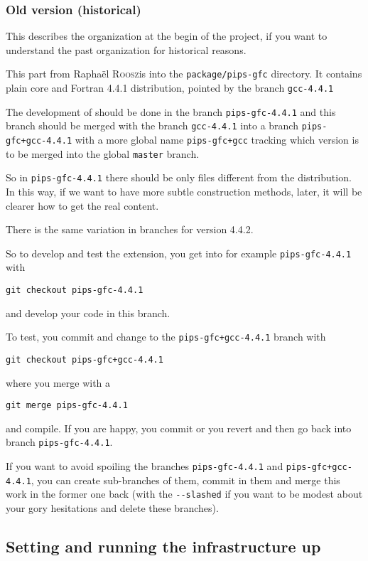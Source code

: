 \documentclass[a4paper]{article}
\begin{document}
\subsubsection{Old version (historical)}
\label{sec:old-version}


This describes the organization at the begin of the project, if you want
to understand the past organization for historical reasons.

This part from Raphaël \textsc{Roosz}is into the \texttt{package/pips-gfc}
directory. It contains plain \Agcc core and Fortran 4.4.1 distribution,
pointed by the branch \texttt{gcc-4.4.1}

The development of \Apipsgfc should be done in the branch
\texttt{pips-gfc-4.4.1} and this branch should be merged with the
branch \texttt{gcc-4.4.1} into a branch \texttt{pips-gfc+gcc-4.4.1} with a
more global name \texttt{pips-gfc+gcc} tracking which version is to be
merged into the global \texttt{master} branch.

So in \texttt{pips-gfc-4.4.1} there should be only files different from
the \Agcc distribution. In this way, if we want to have more subtle
construction methods, later, it will be clearer how to get the real
content.

There is the same variation in branches for version 4.4.2.

So to develop and test the \Apipsgfc extension, you get into for example
\texttt{pips-gfc-4.4.1} with
\begin{verbatim}
git checkout pips-gfc-4.4.1
\end{verbatim}
and develop your code in this branch.

To test, you commit and change to the \texttt{pips-gfc+gcc-4.4.1} branch with
\begin{verbatim}
git checkout pips-gfc+gcc-4.4.1
\end{verbatim}
where you merge with a
\begin{verbatim}
git merge pips-gfc-4.4.1
\end{verbatim}
and compile. If you are happy, you commit or you revert and then go back
into branch \texttt{pips-gfc-4.4.1}.

If you want to avoid spoiling the branches \texttt{pips-gfc-4.4.1} and
\texttt{pips-gfc+gcc-4.4.1}, you can create sub-branches of them, commit in
them and merge this work in the former one back (with the \verb|--slashed|
if you want to be modest about your gory hesitations \smiley{} and delete
these branches).


\subsection{Setting and running the infrastructure up}
\label{sec:setup}
\end{document}
